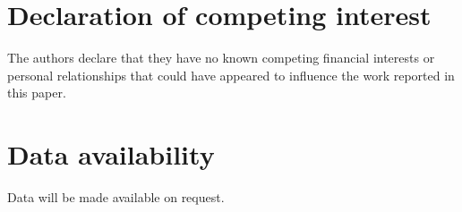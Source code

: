 \documentclass[a4paper,fleqn]{cas-dc}
\begin{document}


\printcredits

\section*{Declaration of competing interest}

The authors declare that they have no known competing financial interests or personal relationships that could have appeared to influence the work reported in this paper.

\section*{Data availability}

Data will be made available on request.

%








\end{document}
